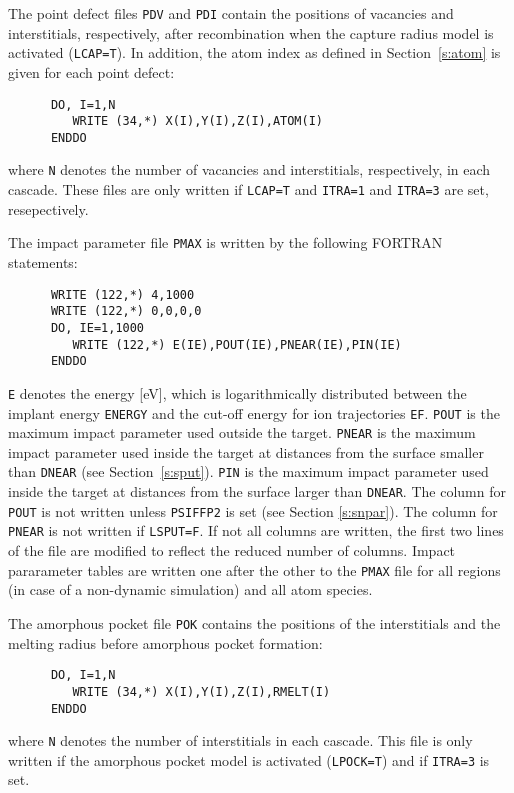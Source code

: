 \bigskip
\fi

The point defect files \texttt{PDV} and \texttt{PDI} contain the positions of
vacancies and interstitials, respectively, after recombination when the capture
radius model is activated (\texttt{LCAP=T}). In addition, the atom index as
defined in Section~\ref{s:atom} is given for each point defect:
%
\begin{verbatim}
      DO, I=1,N
         WRITE (34,*) X(I),Y(I),Z(I),ATOM(I)
      ENDDO
\end{verbatim}
%
where \texttt{N} denotes the number of vacancies and interstitials,
respectively, in each cascade. These files are only written if \texttt{LCAP=T}
and \texttt{ITRA=1} and \texttt{ITRA=3} are set, resepectively.

The impact parameter file \texttt{PMAX} is written by the following FORTRAN statements:
%
\begin{verbatim}
      WRITE (122,*) 4,1000
      WRITE (122,*) 0,0,0,0
      DO, IE=1,1000
         WRITE (122,*) E(IE),POUT(IE),PNEAR(IE),PIN(IE)
      ENDDO
\end{verbatim}
%
\texttt{E} denotes the energy [eV], which is logarithmically distributed between
the implant energy \texttt{ENERGY} and the cut-off energy for ion trajectories
\texttt{EF}. \texttt{POUT} is the maximum impact parameter used outside the
target. \texttt{PNEAR} is the maximum impact parameter used inside the target at
distances from the surface smaller than \texttt{DNEAR} (see
Section~\ref{s:sput}). \texttt{PIN} is the maximum impact parameter used inside
the target at distances from the surface larger than \texttt{DNEAR}. The column
for \texttt{POUT} is not written unless \texttt{PSIFFP2} is set (see Section
\ref{s:snpar}). The column for \texttt{PNEAR} is not written if
\texttt{LSPUT=F}. If not all columns are written, the first two lines of the
file are modified to reflect the reduced number of columns. Impact pararameter
tables are written one after the other to the \texttt{PMAX} file for all regions
(in case of a non-dynamic simulation) and all atom species.

The amorphous pocket file \texttt{POK} contains the positions of the
interstitials and the melting radius before amorphous pocket formation:
%
\begin{verbatim}
      DO, I=1,N
         WRITE (34,*) X(I),Y(I),Z(I),RMELT(I)
      ENDDO
\end{verbatim}
%
where \texttt{N} denotes the number of interstitials in each cascade. This
file is only written  if the amorphous pocket model is activated
(\texttt{LPOCK=T}) and if \texttt{ITRA=3} is set.


